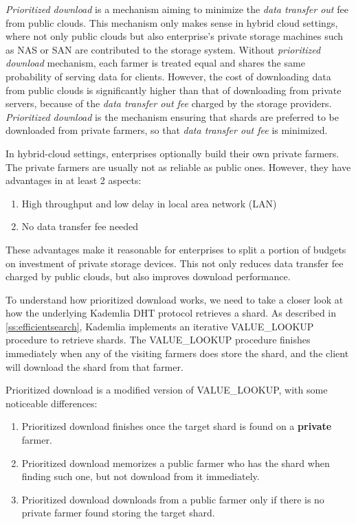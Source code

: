 \textit{Prioritized download} is a mechanism aiming to minimize the \textit{data transfer out} fee from public clouds. This mechanism only makes sense in hybrid cloud settings, where not only public clouds but also enterprise's private storage machines such as NAS or SAN are contributed to the storage system. Without \textit{prioritized download} mechanism, each farmer is treated equal and shares the same probability of serving data for clients. However, the cost of downloading data from public clouds is significantly higher than that of downloading from private servers, because of the \textit{data transfer out fee} charged by the storage providers. \textit{Prioritized download} is the mechanism ensuring that shards are preferred to be downloaded from private farmers, so that \textit{data transfer out fee} is minimized.

In hybrid-cloud settings, enterprises optionally build their own private farmers. The private farmers are usually not as reliable as public ones. However, they have advantages in at least 2 aspects:

\begin{enumerate}
  \item High throughput and low delay in local area network (LAN)
  \item No data transfer fee needed
\end{enumerate}

These advantages make it reasonable for enterprises to split a portion of budgets on investment of private storage devices. This not only reduces data transfer fee charged by public clouds, but also improves download performance.

To understand how prioritized download works, we need to take a closer look at how the underlying Kademlia DHT protocol retrieves a shard. As described in \ref{ss:efficientsearch}, Kademlia implements an iterative VALUE\_LOOKUP procedure to retrieve shards. The VALUE\_LOOKUP procedure finishes immediately when any of the visiting farmers does store the shard, and the client will download the shard from that farmer.

Prioritized download is a modified version of VALUE\_LOOKUP, with some noticeable differences:

\begin{enumerate}
  \item Prioritized download finishes once the target shard is found on a \textbf{private} farmer.
  \item Prioritized download memorizes a public farmer who has the shard when finding such one, but not download from it immediately.
  \item Prioritized download downloads from a public farmer only if there is no private farmer found storing the target shard.
\end{enumerate}

